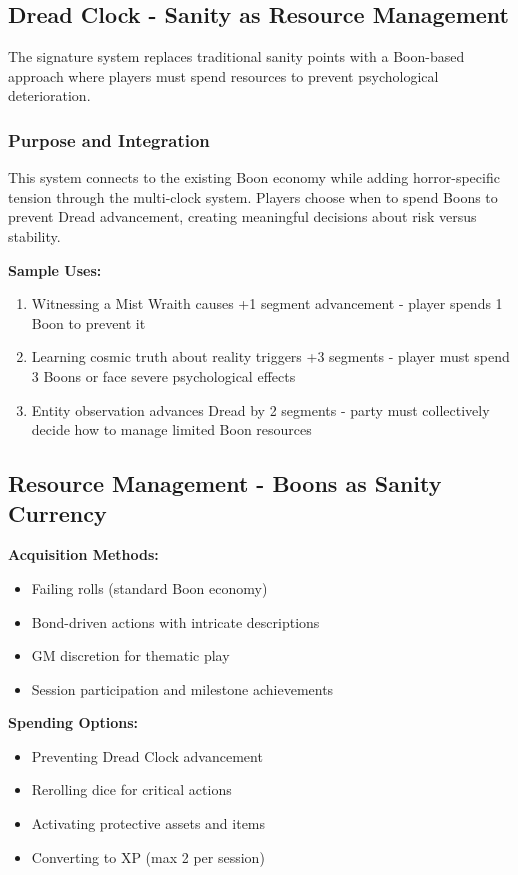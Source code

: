 \documentclass[11pt]{article}
\newenvironment{mechanic}[1]{%
  \begin{mdframed}[backgroundcolor=tableheader, linewidth=1pt, linecolor=accentcolor]%
  \subsubsection*{#1}%
}{%
  \end{mdframed}%
}
\begin{document}
\subsection{Dread Clock - Sanity as Resource Management}

The signature system replaces traditional sanity points with a Boon-based approach where players must spend resources to prevent psychological deterioration.

\begin{mechanic}{Purpose and Integration}
This system connects to the existing Boon economy while adding horror-specific tension through the multi-clock system. Players choose when to spend Boons to prevent Dread advancement, creating meaningful decisions about risk versus stability.
\end{mechanic}

\textbf{Sample Uses:}
\begin{enumerate}
\item Witnessing a Mist Wraith causes +1 segment advancement - player spends 1 Boon to prevent it
\item Learning cosmic truth about reality triggers +3 segments - player must spend 3 Boons or face severe psychological effects
\item Entity observation advances Dread by 2 segments - party must collectively decide how to manage limited Boon resources
\end{enumerate}

\subsection{Resource Management - Boons as Sanity Currency}

\textbf{Acquisition Methods:}
\begin{itemize}
\item Failing rolls (standard Boon economy)
\item Bond-driven actions with intricate descriptions
\item GM discretion for thematic play
\item Session participation and milestone achievements
\end{itemize}

\textbf{Spending Options:}
\begin{itemize}
\item Preventing Dread Clock advancement
\item Rerolling dice for critical actions
\item Activating protective assets and items
\item Converting to XP (max 2 per session)
\end{itemize}
\end{document}
